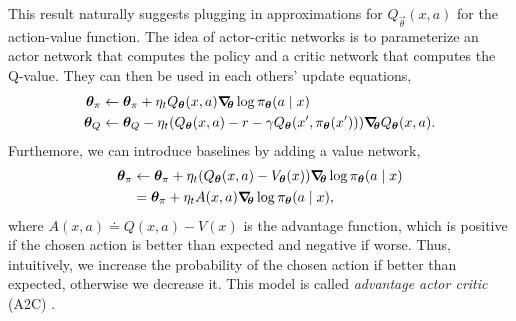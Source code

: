 This result naturally suggests plugging in approximations for
$Q_{\vec{\theta}}(x,a)$ for the action-value function. The idea of actor-critic
networks is to parameterize an actor network that computes the policy and a
critic network that computes the Q-value. They can then be used in each others'
update equations, 
\begin{align*}
  \vec{\theta}_\pi &\gets \vec{\theta}_\pi + \eta_t Q_{\vec{\theta}}(x,a) \grad{\log \pi_{\vec{\theta}}(a\mid x)}{\vec{\theta}} \\
  \vec{\theta}_Q &\gets \vec{\theta}_Q - \eta_t \lft( Q_{\vec{\theta}}(x,a) - r - \gamma Q_{\vec{\theta}}(x',\pi_{\vec{\theta}}(x')) \rgt) \grad{Q_{\vec{\theta}}(x,a)}{\vec{\theta}}
.\end{align*}
Furthemore, we can introduce baselines by adding a value network,
\begin{align*}
  \bm{\theta}_\pi &\gets \bm{\theta}_\pi + \eta_t ( Q_{\bm{\theta}}(x,a) - V_{\bm{\theta}}(x)) \bm{\nabla}_{\!\! \bm{\theta}} \log \pi_{\bm{\theta}}(a\mid x) \\
  &= \bm{\theta}_\pi + \eta_t A(x,a) \bm{\nabla}_{\!\! \bm{\theta}} \log \pi_{\bm{\theta}}(a\mid x)
,\end{align*}
where $A(x,a) \doteq Q(x,a) - V(x)$ is the advantage function, which is
positive if the chosen action is better than expected and negative if worse.
Thus, intuitively, we increase the probability of the chosen action if better
than expected, otherwise we decrease it. This model is called \textit{advantage
actor critic} (A2C) \citep{mnih2016asynchronous}.

